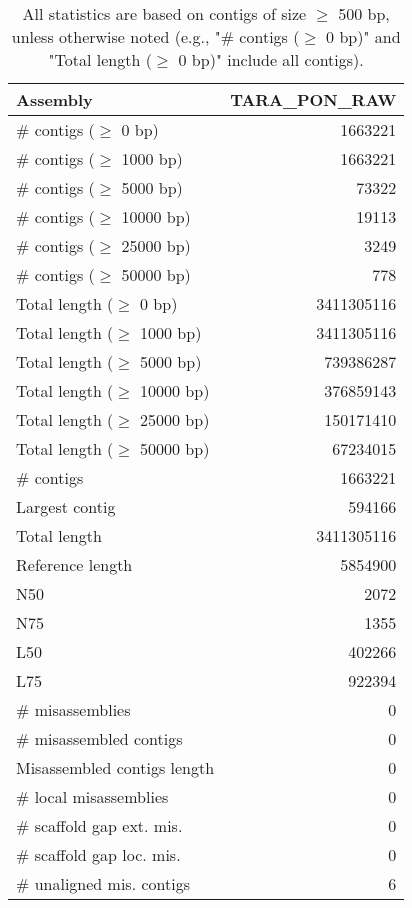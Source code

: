 \documentclass[12pt,a4paper]{article}
\begin{document}
\begin{table}[ht]
\begin{center}
\caption{All statistics are based on contigs of size $\geq$ 500 bp, unless otherwise noted (e.g., "\# contigs ($\geq$ 0 bp)" and "Total length ($\geq$ 0 bp)" include all contigs).}
\begin{tabular}{|l*{1}{|r}|}
\hline
Assembly & TARA\_PON\_RAW \\ \hline
\# contigs ($\geq$ 0 bp) & 1663221 \\ \hline
\# contigs ($\geq$ 1000 bp) & 1663221 \\ \hline
\# contigs ($\geq$ 5000 bp) & 73322 \\ \hline
\# contigs ($\geq$ 10000 bp) & 19113 \\ \hline
\# contigs ($\geq$ 25000 bp) & 3249 \\ \hline
\# contigs ($\geq$ 50000 bp) & 778 \\ \hline
Total length ($\geq$ 0 bp) & 3411305116 \\ \hline
Total length ($\geq$ 1000 bp) & 3411305116 \\ \hline
Total length ($\geq$ 5000 bp) & 739386287 \\ \hline
Total length ($\geq$ 10000 bp) & 376859143 \\ \hline
Total length ($\geq$ 25000 bp) & 150171410 \\ \hline
Total length ($\geq$ 50000 bp) & 67234015 \\ \hline
\# contigs & 1663221 \\ \hline
Largest contig & 594166 \\ \hline
Total length & 3411305116 \\ \hline
Reference length & 5854900 \\ \hline
N50 & 2072 \\ \hline
N75 & 1355 \\ \hline
L50 & 402266 \\ \hline
L75 & 922394 \\ \hline
\# misassemblies & 0 \\ \hline
\# misassembled contigs & 0 \\ \hline
Misassembled contigs length & 0 \\ \hline
\# local misassemblies & 0 \\ \hline
\# scaffold gap ext. mis. & 0 \\ \hline
\# scaffold gap loc. mis. & 0 \\ \hline
\# unaligned mis. contigs & 6 \\ \hline

\end{tabular}
\end{center}
\end{table}
\end{document}
